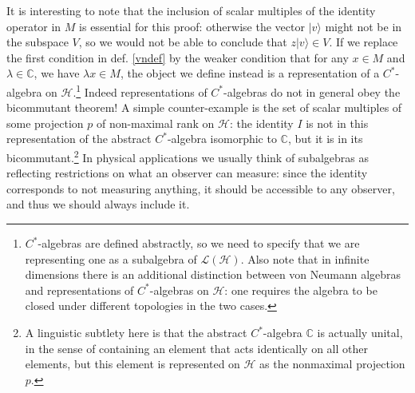 \documentclass[12pt]{article}
\newcommand{\ran}{\rangle}
\newcommand{\Ll}{\mathcal{L}}
\newcommand{\Hh}{\mathcal{H}}
\newcommand{\LH}{\Ll(\Hh)}
\begin{document}
It is interesting to note that the inclusion of scalar multiples of the identity operator in $M$ is essential for this proof: otherwise the vector $|v\ran$ might not be in the subspace $V$, so we would not be able to conclude that $z|v\ran\in V$.  If we replace the first condition in def. \eqref{vndef} by the weaker condition that for any $x\in M$ and $\lambda \in \mathbb{C}$, we have $\lambda x \in M$, the object we define instead is a representation of a $C^*$-algebra on $\mathcal{H}$.\footnote{$C^*$-algebras are defined abstractly, so we need to specify that we are representing one as a subalgebra of $\LH$.  Also note that in infinite dimensions there is an additional distinction between von Neumann algebras and representations of $C^*$-algebras on $\mathcal{H}$: one requires the algebra to be closed under different topologies in the two cases.} Indeed representations of $C^*$-algebras do not in general obey the bicommutant theorem!  A simple counter-example is the set of scalar multiples of some projection $p$ of non-maximal rank on $\Hh$: the identity $I$ is not in this representation of the abstract $C^*$-algebra isomorphic to $\mathbb{C}$, but it is in its bicommutant.\footnote{A linguistic subtlety here is that the abstract $C^*$-algebra $\mathbb{C}$ is actually unital, in the sense of containing an element that acts identically on all other elements, but this element is represented on $\Hh$ as the nonmaximal projection $p$.}  In physical applications we usually think of subalgebras as reflecting restrictions on what an observer can measure: since the identity corresponds to not measuring anything, it should be accessible to any observer, and thus we should always include it.
\end{document}
